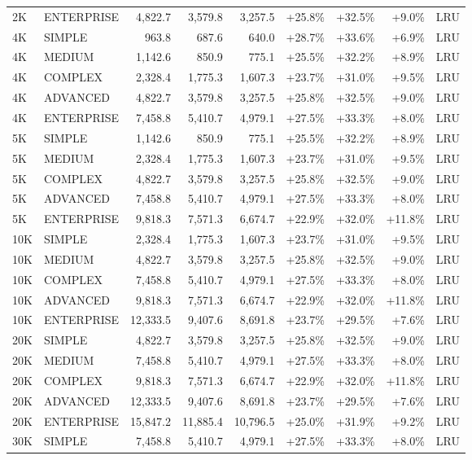 \documentclass{article}
\begin{document}
\begin{longtable}{|l|l|r|r|r|r|r|r|l|}
2K & ENTERPRISE & 4,822.7 & 3,579.8 & 3,257.5 & +25.8\% & +32.5\% & +9.0\% & LRU \\
4K & SIMPLE & 963.8 & 687.6 & 640.0 & +28.7\% & +33.6\% & +6.9\% & LRU \\
4K & MEDIUM & 1,142.6 & 850.9 & 775.1 & +25.5\% & +32.2\% & +8.9\% & LRU \\
4K & COMPLEX & 2,328.4 & 1,775.3 & 1,607.3 & +23.7\% & +31.0\% & +9.5\% & LRU \\
4K & ADVANCED & 4,822.7 & 3,579.8 & 3,257.5 & +25.8\% & +32.5\% & +9.0\% & LRU \\
4K & ENTERPRISE & 7,458.8 & 5,410.7 & 4,979.1 & +27.5\% & +33.3\% & +8.0\% & LRU \\
5K & SIMPLE & 1,142.6 & 850.9 & 775.1 & +25.5\% & +32.2\% & +8.9\% & LRU \\
5K & MEDIUM & 2,328.4 & 1,775.3 & 1,607.3 & +23.7\% & +31.0\% & +9.5\% & LRU \\
5K & COMPLEX & 4,822.7 & 3,579.8 & 3,257.5 & +25.8\% & +32.5\% & +9.0\% & LRU \\
5K & ADVANCED & 7,458.8 & 5,410.7 & 4,979.1 & +27.5\% & +33.3\% & +8.0\% & LRU \\
5K & ENTERPRISE & 9,818.3 & 7,571.3 & 6,674.7 & +22.9\% & +32.0\% & +11.8\% & LRU \\
10K & SIMPLE & 2,328.4 & 1,775.3 & 1,607.3 & +23.7\% & +31.0\% & +9.5\% & LRU \\
10K & MEDIUM & 4,822.7 & 3,579.8 & 3,257.5 & +25.8\% & +32.5\% & +9.0\% & LRU \\
10K & COMPLEX & 7,458.8 & 5,410.7 & 4,979.1 & +27.5\% & +33.3\% & +8.0\% & LRU \\
10K & ADVANCED & 9,818.3 & 7,571.3 & 6,674.7 & +22.9\% & +32.0\% & +11.8\% & LRU \\
10K & ENTERPRISE & 12,333.5 & 9,407.6 & 8,691.8 & +23.7\% & +29.5\% & +7.6\% & LRU \\
20K & SIMPLE & 4,822.7 & 3,579.8 & 3,257.5 & +25.8\% & +32.5\% & +9.0\% & LRU \\
20K & MEDIUM & 7,458.8 & 5,410.7 & 4,979.1 & +27.5\% & +33.3\% & +8.0\% & LRU \\
20K & COMPLEX & 9,818.3 & 7,571.3 & 6,674.7 & +22.9\% & +32.0\% & +11.8\% & LRU \\
20K & ADVANCED & 12,333.5 & 9,407.6 & 8,691.8 & +23.7\% & +29.5\% & +7.6\% & LRU \\
20K & ENTERPRISE & 15,847.2 & 11,885.4 & 10,796.5 & +25.0\% & +31.9\% & +9.2\% & LRU \\
30K & SIMPLE & 7,458.8 & 5,410.7 & 4,979.1 & +27.5\% & +33.3\% & +8.0\% & LRU \\

\end{longtable}
\end{document}
